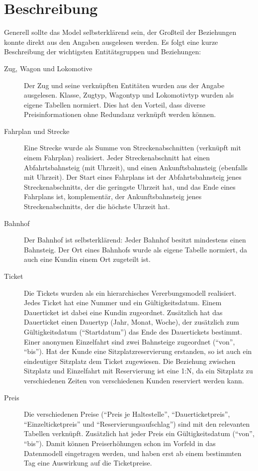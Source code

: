 \section{Beschreibung}
\label{section:Beschreibung}

Generell sollte das Model selbsterklärend sein, der Großteil der Beziehungen konnte direkt aus den Angaben ausgelesen werden. 
Es folgt eine kurze Beschreibung der wichtigsten Entitätsgruppen und Beziehungen:

\begin{description}
    \item[Zug, Wagon und Lokomotive] Der Zug und seine verknüpften Entitäten wurden aus der Angabe ausgelesen. 
    Klasse, Zugtyp, Wagontyp und Lokomotivtyp wurden als eigene Tabellen normiert. 
    Dies hat den Vorteil, dass diverse Preisinformationen ohne Redundanz verknüpft werden können.
    \item[Fahrplan und Strecke] Eine Strecke wurde als Summe von Streckenabschnitten (verknüpft mit einem Fahrplan) realisiert.
    Jeder Streckenabschnitt hat einen Abfahrtsbahnsteig (mit Uhrzeit), und einen Ankunftsbahnsteig (ebenfalls mit Uhrzeit). 
    Der Start eines Fahrplans ist der Abfahrtsbahnsteig jenes Streckenabschnitts, der die geringste Uhrzeit hat, 
    und das Ende eines Fahrplans ist, komplementär, der Ankunftsbahnsteig jenes Streckenabschnitts, der die höchste Uhrzeit hat.
    \item[Bahnhof] Der Bahnhof ist selbsterklärend: Jeder Bahnhof besitzt mindestens einen Bahnsteig. 
    Der Ort eines Bahnhofs wurde als eigene Tabelle normiert, da auch eine Kundin einem Ort zugeteilt ist.
    \item[Ticket] Die Tickets wurden als ein hierarchisches Vererbungsmodell realisiert. Jedes Ticket hat eine Nummer und ein Gültigkeitsdatum.
    Einem Dauerticket ist dabei eine Kundin zugeordnet. Zusätzlich hat das Dauerticket einen Dauertyp (Jahr, Monat, Woche), 
    der zusätzlich zum Gültigkeitsdatum (``Startdatum'') das Ende des Dauertickets bestimmt.
    Einer anonymen Einzelfahrt sind zwei Bahnsteige zugeordnet (``von'', ``bis'').
    Hat der Kunde eine Sitzplatzreservierung erstanden, so ist auch ein eindeutiger Sitzplatz dem Ticket zugewiesen.
    Die Beziehung zwischen Sitzplatz und Einzelfahrt mit Reservierung ist eine 1:N, da ein Sitzplatz zu verschiedenen Zeiten 
    von verschiedenen Kunden reserviert werden kann.
    \item[Preis] Die verschiedenen Preise (``Preis je Haltestelle'', ``Dauerticketpreis'', ``Einzelticketpreis'' und ``Reservierungsaufschlag'') 
    sind mit den relevanten Tabellen verknüpft. Zusätzlich hat jeder Preis ein Gültigkeitsdatum (``von'', ``bis''). 
    Damit können Preiserhöhungen schon im Vorfeld in das Datenmodell eingetragen werden, und haben erst ab einem bestimmten Tag eine Auswirkung auf die Ticketpreise.
\end{description}
